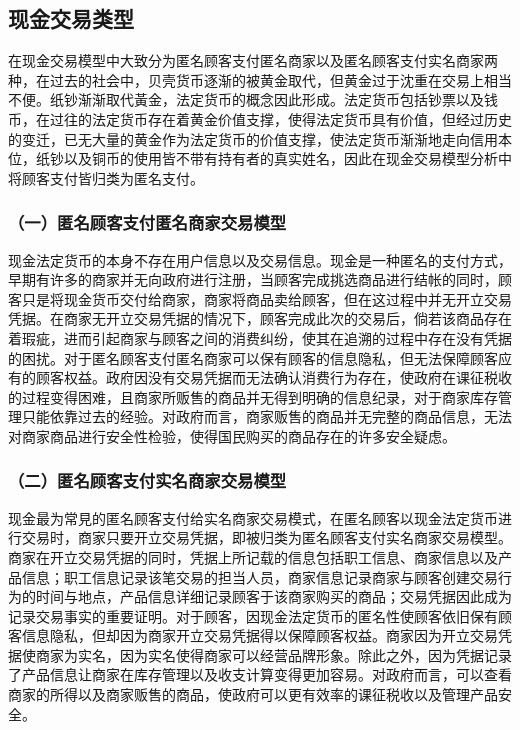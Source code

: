 	\subsection{现金交易类型}
	在现金交易模型中大致分为匿名顾客支付匿名商家以及匿名顾客支付实名商家两种，在过去的社会中，贝壳货币逐渐的被黄金取代，但黄金过于沈重在交易上相当不便。纸钞渐渐取代⿈⾦，法定货币的概念因此形成。法定货币包括钞票以及钱币，在过往的法定货币存在着黄金价值支撑，使得法定货币具有价值，但经过历史的变迁，已无⼤量的黄金作为法定货币的价值⽀撑，使法定货币渐渐地⾛向信⽤本位，纸钞以及铜币的使用皆不带有持有者的真实姓名，因此在现金交易模型分析中将顾客支付皆归类为匿名支付。

		\subsubsection{（一）匿名顾客支付匿名商家交易模型}
		现金法定货币的本身不存在用户信息以及交易信息。现⾦是一种匿名的支付方式，早期有许多的商家并无向政府进行注册，当顾客完成挑选商品进行结帐的同时，顾客只是将现金货币交付给商家，商家将商品卖给顾客，但在这过程中并无开立交易凭据。在商家无开立交易凭据的情况下，顾客完成此次的交易后，倘若该商品存在着瑕疵，进而引起商家与顾客之间的消费纠纷，使其在追溯的过程中存在没有凭据的困扰。对于匿名顾客支付匿名商家可以保有顾客的信息隐私，但无法保障顾客应有的顾客权益。政府因没有交易凭据而无法确认消费行为存在，使政府在课征税收的过程变得困难，且商家所贩售的商品并无得到明确的信息纪录，对于商家库存管理只能依靠过去的经验。对政府而言，商家贩售的商品并无完整的商品信息，无法对商家商品进行安全性检验，使得国民购买的商品存在的许多安全疑虑。

		\subsubsection{（二）匿名顾客支付实名商家交易模型}
		现⾦最为常⾒的匿名顾客⽀付给实名商家交易模式，在匿名顾客以现⾦法定货币进⾏交易时，商家只要开⽴交易凭据，即被归类为匿名顾客⽀付实名商家交易模型。商家在开⽴交易凭据的同时，凭据上所记载的信息包括职⼯信息、商家信息以及产品信息；职⼯信息记录该笔交易的担当人员，商家信息记录商家与顾客创建交易行为的时间与地点，产品信息详细记录顾客于该商家购买的商品；交易凭据因此成为记录交易事实的重要证明。对于顾客，因现⾦法定货币的匿名性使顾客依旧保有顾客信息隐私，但却因为商家开⽴交易凭据得以保障顾客权益。商家因为开⽴交易凭据使商家为实名，因为实名使得商家可以经营品牌形象。除此之外，因为凭据记录了产品信息让商家在库存管理以及收支计算变得更加容易。对政府⽽⾔，可以查看商家的所得以及商家贩售的商品，使政府可以更有效率的课征税收以及管理产品安全。

